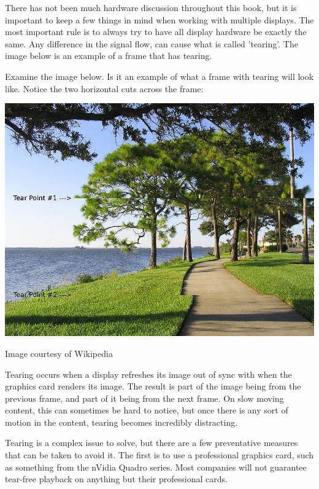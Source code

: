 \begin{fullwidth}

There has not been much hardware discussion throughout this book, but it is important to keep a few things in mind when working with multiple displays. The most important rule is to always try to have all display hardware be exactly the same. Any difference in the signal flow, can cause what is called 'tearing'. The image below is an example of a frame that has tearing.

Examine the image below. Is it an example of what a frame with tearing will look like. Notice the two horizontal cuts across the frame:

\vspace{10mm}

\begin{center}
\includegraphics{./img/10.4/tearing.jpg}
\begin{footnotesize}
Image courtesy of Wikipedia
\end{footnotesize}
\end{center}

Tearing occurs when a display refreshes its image out of sync with when the graphics card renders its image. The result is part of the image being from the previous frame, and part of it being from the next frame. On slow moving content, this can sometimes be hard to notice, but once there is any sort of motion in the content, tearing becomes incredibly distracting.

Tearing is a complex issue to solve, but there are a few preventative measures that can be taken to avoid it. The first is to use a professional graphics card, such as something from the nVidia Quadro series. Most companies will not guarantee tear-free playback on anything but their professional cards.


\end{fullwidth}
